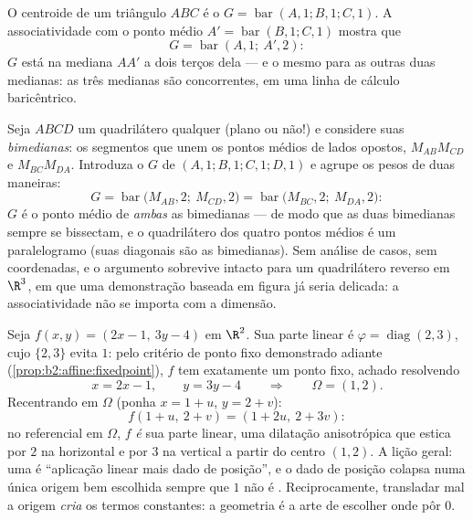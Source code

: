 \begin{example}\label{ex:b2:affine:median}
O centroide de um triângulo $ABC$ é o  $G =
\operatorname{bar}(A,1; B,1; C,1)$. A associatividade com o
ponto médio $A' = \operatorname{bar}(B, 1; C, 1)$ mostra que
\[
G = \operatorname{bar}(A, 1;\ A', 2) :
\]
$G$ está na mediana $AA'$ a dois terços dela --- e o mesmo
para as outras duas medianas: as três medianas são concorrentes, em
uma linha de cálculo baricêntrico.
\end{example}

\begin{example}\label{ex:b2:affine:bimedians}
Seja $ABCD$ um quadrilátero qualquer (plano ou não!) e considere
suas \emph{bimedianas}: os segmentos que unem os pontos médios de
lados opostos, $M_{AB}M_{CD}$ e $M_{BC}M_{DA}$. Introduza
o  $G$ de $(A,1; B,1; C,1; D,1)$ e agrupe os
pesos de duas maneiras:
\[
G = \operatorname{bar}\bigl(M_{AB}, 2;\ M_{CD}, 2\bigr)
= \operatorname{bar}\bigl(M_{BC}, 2;\ M_{DA}, 2\bigr) :
\]
$G$ é o ponto médio de \emph{ambas} as bimedianas --- de modo que as duas
bimedianas sempre se bissectam, e o quadrilátero dos
quatro pontos médios é um paralelogramo (suas diagonais são as
bimedianas). Sem análise de casos, sem coordenadas, e o
argumento sobrevive intacto para um quadrilátero reverso em
$\R^3$, em que uma demonstração baseada em figura já seria
delicada: a associatividade não se importa com a dimensão.
\end{example}

\begin{example}\label{ex:b2:affine:dilation}
Seja $f(x, y) = (2x - 1,\ 3y - 4)$ em $\R^2$. Sua parte linear
é $\varphi = \operatorname{diag}(2, 3)$, cujo 
$\{2, 3\}$ evita $1$: pelo critério de ponto fixo demonstrado
adiante (\cref{prop:b2:affine:fixedpoint}), $f$ tem exatamente um
ponto fixo, achado resolvendo
\[
x = 2x - 1, \qquad y = 3y - 4
\qquad\Longrightarrow\qquad \Omega = (1, 2).
\]
Recentrando em $\Omega$ (ponha $x = 1 + u$, $y = 2 + v$):
\[
f(1 + u,\ 2 + v) = (1 + 2u,\ 2 + 3v) :
\]
no referencial em $\Omega$, $f$ \emph{é} sua parte linear, uma
dilatação anisotrópica que estica por $2$ na horizontal e por $3$
na vertical a partir do centro $(1, 2)$. A lição geral: uma
 é ``aplicação linear mais dado de posição'', e o
dado de posição colapsa numa única origem bem escolhida sempre que
$1$ não é . Reciprocamente, transladar mal a origem
\emph{cria} os termos constantes: a geometria  é
a arte de escolher onde pôr $0$.
\end{example}

